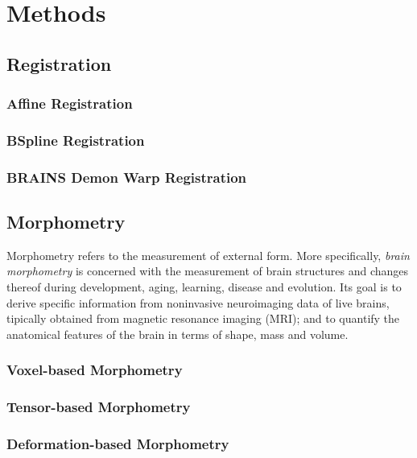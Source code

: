 \chapter{Methods}

\section{Registration}
\subsection{Affine Registration}
\subsection{BSpline Registration}
\subsection{BRAINS Demon Warp Registration}

\section{Morphometry}
Morphometry refers to the measurement of external form. More specifically, \textit{brain morphometry} is concerned with the measurement of brain structures and changes thereof during development, aging, learning, disease and evolution. Its goal is to derive specific information from noninvasive neuroimaging data of live brains, tipically obtained from magnetic resonance imaging (MRI); and to quantify the anatomical features of the brain in terms of shape, mass and volume. \cite{brmorph}

\subsection{Voxel-based Morphometry}

\subsection{Tensor-based Morphometry}
\subsection{Deformation-based Morphometry}